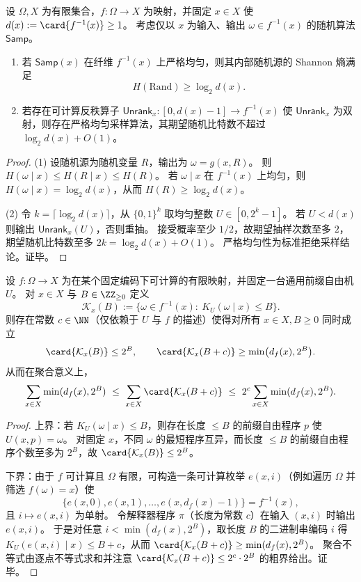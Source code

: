\begin{proposition}[纤维均匀采样的随机性复杂度与反秩构造]\label{prop:pom-uniform-fiber-sampling-randomness-optimality}
设 \(\Omega,X\) 为有限集合，\(f:\Omega\to X\) 为映射，并固定 \(x\in X\) 使 \(d(x):=\card{f^{-1}(x)}\ge 1\)。
考虑仅以 \(x\) 为输入、输出 \(\omega\in f^{-1}(x)\) 的随机算法 \(\mathsf{Samp}\)。
\begin{enumerate}
\normalfont
  \item 若 \(\mathsf{Samp}(x)\) 在纤维 \(f^{-1}(x)\) 上严格均匀，则其内部随机源的 Shannon 熵满足
  \[
  H(\mathrm{Rand})\ge \log_2 d(x).
  \]
  \item 若存在可计算反秩算子 \(\mathsf{Unrank}_x:[0,d(x)-1]\to f^{-1}(x)\) 使 \(\mathsf{Unrank}_x\) 为双射，则存在严格均匀采样算法，其期望随机比特数不超过 \(\log_2 d(x)+O(1)\)。
\end{enumerate}
\end{proposition}
\begin{proof}
(1) 设随机源为随机变量 \(R\)，输出为 \(\omega=g(x,R)\)。
则 \(H(\omega\mid x)\le H(R\mid x)\le H(R)\)。
若 \(\omega\mid x\) 在 \(f^{-1}(x)\) 上均匀，则 \(H(\omega\mid x)=\log_2 d(x)\)，从而 \(H(R)\ge \log_2 d(x)\)。
\par
(2) 令 \(k=\lceil\log_2 d(x)\rceil\)，从 \(\{0,1\}^k\) 取均匀整数 \(U\in[0,2^k-1]\)。
若 \(U<d(x)\) 则输出 \(\mathsf{Unrank}_x(U)\)，否则重抽。
接受概率至少 \(1/2\)，故期望抽样次数至多 \(2\)，期望随机比特数至多 \(2k=\log_2 d(x)+O(1)\)。
严格均匀性为标准拒绝采样结论。证毕。
\end{proof}

\begin{theorem}\label{thm:pom-oracle-capacity-kolmogorov-spectrum}
设 \(f:\Omega\to X\) 为在某个固定编码下可计算的有限映射，并固定一台通用前缀自由机 \(U\)。
对 \(x\in X\) 与 \(B\in\ZZ_{\ge 0}\) 定义
\[
\mathcal K_x(B):=\{\omega\in f^{-1}(x):\ K_U(\omega\mid x)\le B\}.
\]
则存在常数 \(c\in\NN\)（仅依赖于 \(U\) 与 \(f\) 的描述）使得对所有 \(x\in X,B\ge 0\) 同时成立
\[
\card{\mathcal K_x(B)}\le 2^B,
\qquad
\card{\mathcal K_x(B+c)}\ge \min\bigl(d_f(x),2^B\bigr).
\]
从而在聚合意义上，
\[
\sum_{x\in X}\min(d_f(x),2^B)
\ \le\
\sum_{x\in X}\card{\mathcal K_x(B+c)}
\ \le\
2^c\sum_{x\in X}\min(d_f(x),2^B).
\]
\end{theorem}

\begin{proof}
上界：若 \(K_U(\omega\mid x)\le B\)，则存在长度 \(\le B\) 的前缀自由程序 \(p\) 使 \(U(x,p)=\omega\)。
对固定 \(x\)，不同 \(\omega\) 的最短程序互异，而长度 \(\le B\) 的前缀自由程序个数至多为 \(2^B\)，故 \(\card{\mathcal K_x(B)}\le 2^B\)。
\par
下界：由于 \(f\) 可计算且 \(\Omega\) 有限，可构造一条可计算枚举 \(e(x,i)\)（例如遍历 \(\Omega\) 并筛选 \(f(\omega)=x\)）使
\[
\{e(x,0),e(x,1),\dots,e(x,d_f(x)-1)\}=f^{-1}(x),
\]
且 \(i\mapsto e(x,i)\) 为单射。
令解释器程序 \(\pi\)（长度为常数 \(c\)）在输入 \((x,i)\) 时输出 \(e(x,i)\)。
于是对任意 \(i<\min(d_f(x),2^B)\)，取长度 \(B\) 的二进制串编码 \(i\) 得 \(K_U(e(x,i)\mid x)\le B+c\)，从而
\(\card{\mathcal K_x(B+c)}\ge \min(d_f(x),2^B)\)。
聚合不等式由逐点不等式求和并注意 \(\card{\mathcal K_x(B+c)}\le 2^c\cdot 2^B\) 的粗界给出。证毕。
\end{proof}

